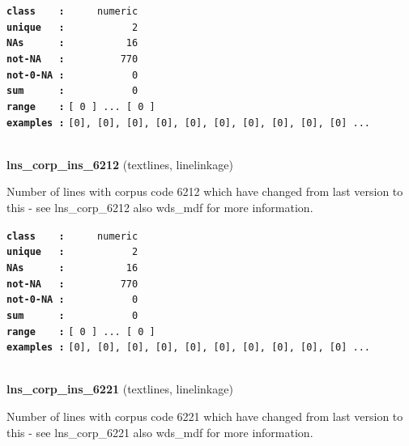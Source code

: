 \documentclass[]{article}
\begin{document}
\textbf{\texttt{class\ \ \ \ :}} \texttt{~~~~~numeric}\\
\textbf{\texttt{unique\ \ \ :}} \texttt{~~~~~~~~~~~2}\\
\textbf{\texttt{NAs\ \ \ \ \ \ :}} \texttt{~~~~~~~~~~16}\\
\textbf{\texttt{not-NA\ \ \ :}} \texttt{~~~~~~~~~770}\\
\textbf{\texttt{not-0-NA\ :}} \texttt{~~~~~~~~~~~0}\\
\textbf{\texttt{sum\ \ \ \ \ \ :}} \texttt{~~~~~~~~~~~0}\\
\textbf{\texttt{range\ \ \ \ :}}
\texttt{{[}\ 0\ {]}\ ...\ {[}\ 0\ {]}}\\
\textbf{\texttt{examples\ :}}
\texttt{{[}0{]},\ {[}0{]},\ {[}0{]},\ {[}0{]},\ {[}0{]},\ {[}0{]},\ {[}0{]},\ {[}0{]},\ {[}0{]},\ {[}0{]}\ ...}\\

~

\textbf{lns\_corp\_ins\_6212} (textlines, linelinkage)

Number of lines with corpus code 6212 which have changed from last
version to this - see lns\_corp\_6212 also wds\_mdf for more
information.

\textbf{\texttt{class\ \ \ \ :}} \texttt{~~~~~numeric}\\
\textbf{\texttt{unique\ \ \ :}} \texttt{~~~~~~~~~~~2}\\
\textbf{\texttt{NAs\ \ \ \ \ \ :}} \texttt{~~~~~~~~~~16}\\
\textbf{\texttt{not-NA\ \ \ :}} \texttt{~~~~~~~~~770}\\
\textbf{\texttt{not-0-NA\ :}} \texttt{~~~~~~~~~~~0}\\
\textbf{\texttt{sum\ \ \ \ \ \ :}} \texttt{~~~~~~~~~~~0}\\
\textbf{\texttt{range\ \ \ \ :}}
\texttt{{[}\ 0\ {]}\ ...\ {[}\ 0\ {]}}\\
\textbf{\texttt{examples\ :}}
\texttt{{[}0{]},\ {[}0{]},\ {[}0{]},\ {[}0{]},\ {[}0{]},\ {[}0{]},\ {[}0{]},\ {[}0{]},\ {[}0{]},\ {[}0{]}\ ...}\\

~

\textbf{lns\_corp\_ins\_6221} (textlines, linelinkage)

Number of lines with corpus code 6221 which have changed from last
version to this - see lns\_corp\_6221 also wds\_mdf for more
information.
\end{document}
